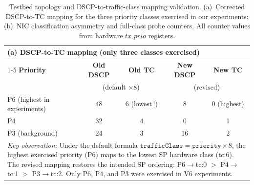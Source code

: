 \begin{table}[htbp]
\centering
\caption{Testbed topology and DSCP-to-traffic-class mapping validation.
(a)~Corrected DSCP-to-TC mapping for the three priority classes
exercised in our experiments;
(b)~NIC classification asymmetry and full-class probe counters.
All counter values from hardware ${tx\_prio}$ registers.}
\label{tab:testbed-hw}
\footnotesize
\begin{tabular}{lcccc}
\toprule
\multicolumn{5}{l}{\textbf{(a) DSCP-to-TC mapping (only three classes exercised)}} \\
\cmidrule(lr){1-5}
\textbf{Priority} & \textbf{Old DSCP} & \textbf{Old TC} & \textbf{New DSCP} & \textbf{New TC} \\
& \multicolumn{2}{c}{(default $\times 8$)} & \multicolumn{2}{c}{(revised)} \\
\midrule
P6 (highest in experiments) & 48 & 6 (lowest\,!) & 8  & 0 (highest) \\
P4                         & 32 & 4             & 0  & 1 \\
P3 (background)            & 24 & 3             & 16 & 2 \\
\midrule
\multicolumn{5}{p{0.85\linewidth}}{\small\textit{Key observation:} Under the default formula $\texttt{trafficClass} = \mathtt{priority} \times 8$, the highest exercised priority (P6) maps to the lowest SP hardware class (tc:6).  The revised mapping restores the intended SP ordering: P6$\rightarrow$tc:0 $>$ P4$\rightarrow$tc:1 $>$ P3$\rightarrow$tc:2.  Only P6, P4, and P3 were exercised in V6 experiments.} \\
\bottomrule
\end{tabular}


\end{table}

